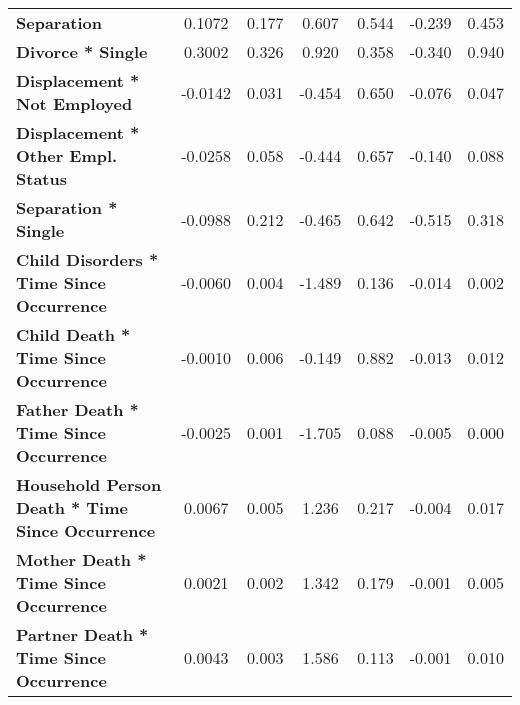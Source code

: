 \begin{center}
\begin{tabular}{lcccccc}
 \textbf{Separation}                                                                                 &       0.1072  &        0.177     &     0.607  &         0.544        &       -0.239    &        0.453     \\
 \textbf{Divorce * Single}                                                     &       0.3002  &        0.326     &     0.920  &         0.358        &       -0.340    &        0.940     \\
 \textbf{Displacement * Not Employed}                                    &      -0.0142  &        0.031     &    -0.454  &         0.650        &       -0.076    &        0.047     \\
 \textbf{Displacement * Other Empl. Status}                                           &      -0.0258  &        0.058     &    -0.444  &         0.657        &       -0.140    &        0.088     \\
 \textbf{Separation * Single}                                                    &      -0.0988  &        0.212     &    -0.465  &         0.642        &       -0.515    &        0.318     \\
 \textbf{Child Disorders * Time Since Occurrence}                                          &      -0.0060  &        0.004     &    -1.489  &         0.136        &       -0.014    &        0.002     \\
 \textbf{Child Death * Time Since Occurrence}                                                &      -0.0010  &        0.006     &    -0.149  &         0.882        &       -0.013    &        0.012     \\
 \textbf{Father Death * Time Since Occurrence}                                              &      -0.0025  &        0.001     &    -1.705  &         0.088        &       -0.005    &        0.000     \\
 \textbf{Household Person Death * Time Since Occurrence}                                      &       0.0067  &        0.005     &     1.236  &         0.217        &       -0.004    &        0.017     \\
 \textbf{Mother Death * Time Since Occurrence}                                              &       0.0021  &        0.002     &     1.342  &         0.179        &       -0.001    &        0.005     \\
 \textbf{Partner Death * Time Since Occurrence}                                            &       0.0043  &        0.003     &     1.586  &         0.113        &       -0.001    &        0.010     \\

\end{tabular}
\end{center}

